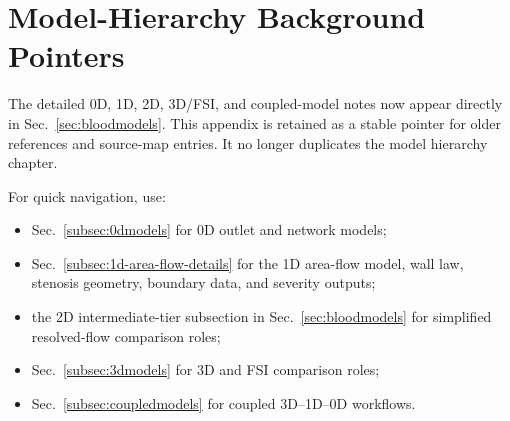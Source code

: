 \section{Model-Hierarchy Background Pointers}
\label{app:model-hierarchy-background-details}

The detailed 0D, 1D, 2D, 3D/FSI, and coupled-model notes now appear directly
in Sec.~\ref{sec:bloodmodels}. This appendix is retained as a stable pointer
for older references and source-map entries. It no longer duplicates the model
hierarchy chapter.

For quick navigation, use:
\begin{itemize}
    \item Sec.~\ref{subsec:0dmodels} for 0D outlet and network models;
    \item Sec.~\ref{subsec:1d-area-flow-details} for the 1D area-flow model,
    wall law, stenosis geometry, boundary data, and severity outputs;
    \item the 2D intermediate-tier subsection in Sec.~\ref{sec:bloodmodels}
    for simplified resolved-flow comparison roles;
    \item Sec.~\ref{subsec:3dmodels} for 3D and FSI comparison roles;
    \item Sec.~\ref{subsec:coupledmodels} for coupled 3D--1D--0D workflows.
\end{itemize}
